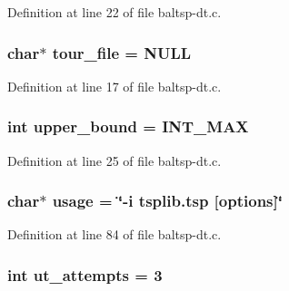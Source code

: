 Definition at line 22 of file baltsp-dt.c.\hypertarget{bin_2baltsp-dt_8c_b818a82f867be75d7c4d92d792b0943e}{
\subsubsection[{tour\_\-file}]{\setlength{\rightskip}{0pt plus 5cm}char$\ast$ {\bf tour\_\-file} = NULL}}
\label{bin_2baltsp-dt_8c_b818a82f867be75d7c4d92d792b0943e}




Definition at line 17 of file baltsp-dt.c.\hypertarget{bin_2baltsp-dt_8c_f5a34eb1d01ffd792adcadc9627ffcb8}{
\subsubsection[{upper\_\-bound}]{\setlength{\rightskip}{0pt plus 5cm}int {\bf upper\_\-bound} = INT\_\-MAX}}
\label{bin_2baltsp-dt_8c_f5a34eb1d01ffd792adcadc9627ffcb8}




Definition at line 25 of file baltsp-dt.c.\hypertarget{bin_2baltsp-dt_8c_adebe2487a2c5240ab6cd02c83add0bf}{
\subsubsection[{usage}]{\setlength{\rightskip}{0pt plus 5cm}char$\ast$ {\bf usage} = \char`\"{}-i tsplib.tsp \mbox{[}{\bf options}\mbox{]}\char`\"{}}}
\label{bin_2baltsp-dt_8c_adebe2487a2c5240ab6cd02c83add0bf}




Definition at line 84 of file baltsp-dt.c.\hypertarget{bin_2baltsp-dt_8c_cbfe40b0a0830962ca1c4cfc2ad1aa97}{
\subsubsection[{ut\_\-attempts}]{\setlength{\rightskip}{0pt plus 5cm}int {\bf ut\_\-attempts} = 3}}
\label{bin_2baltsp-dt_8c_cbfe40b0a0830962ca1c4cfc2ad1aa97}





